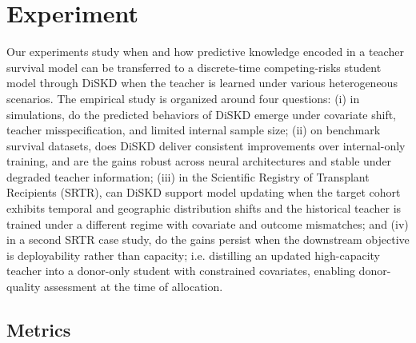 \documentclass{article}
\theoremstyle{plain}
\theoremstyle{definition}
\theoremstyle{remark}
\begin{document}
\section{Experiment}
Our experiments study when and how predictive knowledge encoded in a teacher survival model can be transferred to a discrete-time competing-risks student model through DiSKD when the teacher is learned under various heterogeneous scenarios. The empirical study is organized around four questions:
(i) in simulations, do the predicted behaviors of DiSKD emerge under covariate shift, teacher misspecification, and limited internal sample size;
(ii) on benchmark survival datasets, does DiSKD deliver consistent improvements over internal-only training, and are the gains robust across neural architectures and stable under degraded teacher information;
(iii) in the Scientific Registry of Transplant Recipients (SRTR), can DiSKD support model updating when the target cohort exhibits temporal and geographic distribution shifts and the historical teacher is trained under a different regime with covariate and outcome mismatches; and
(iv) in a second SRTR case study, do the gains persist when the downstream objective is deployability rather than capacity; i.e. distilling an updated high-capacity teacher into a donor-only student with constrained covariates, enabling donor-quality assessment at the time of allocation.


\subsection{Metrics}
\end{document}
